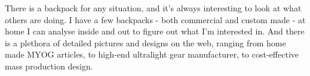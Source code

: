 There is a backpack for any situation, and it's always interesting to look at what others are doing. I have a few backpacks - both commercial and custom made - at home I can analyse inside and out to figure out what I'm interested in. And there is a plethora of detailed pictures and designs on the web, ranging from home made MYOG articles, to high-end ultralight gear manufacturer, to cost-effective mass production design.

